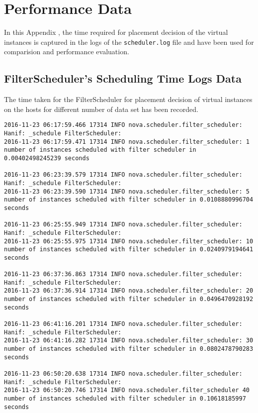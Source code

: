 
\chapter{Performance Data}\label{app:ch:data}

In this Appendix , the time required for placement decision of the virtual instances is captured in the logs of the \verb|scheduler.log| file and have been used for comparision and performance evaluation.

\section{FilterScheduler's Scheduling Time Logs Data}\label{app:sec:filterschedulerlogdata}

The time taken for the FilterScheduler for placement decision of virtual instances on the hosts for different number of data set has been recorded.
\newline
\begin{lstlisting}[frame=single, caption={The filter scheduler based scheduler time logs for scheduling different numbers of virtual instances}, label={lst:filterschedulerlogdata}]
2016-11-23 06:17:59.466 17314 INFO nova.scheduler.filter_scheduler: Hanif: _schedule FilterScheduler:
2016-11-23 06:17:59.471 17314 INFO nova.scheduler.filter_scheduler: 1 number of instances scheduled with filter scheduler in 0.00402498245239 seconds

2016-11-23 06:23:39.579 17314 INFO nova.scheduler.filter_scheduler: Hanif: _schedule FilterScheduler:
2016-11-23 06:23:39.590 17314 INFO nova.scheduler.filter_scheduler: 5 number of instances scheduled with filter scheduler in 0.0108880996704 seconds

2016-11-23 06:25:55.949 17314 INFO nova.scheduler.filter_scheduler: Hanif: _schedule FilterScheduler:
2016-11-23 06:25:55.975 17314 INFO nova.scheduler.filter_scheduler: 10 number of instances scheduled with filter scheduler in 0.0240979194641 seconds

2016-11-23 06:37:36.863 17314 INFO nova.scheduler.filter_scheduler: Hanif: _schedule FilterScheduler:
2016-11-23 06:37:36.914 17314 INFO nova.scheduler.filter_scheduler: 20 number of instances scheduled with filter scheduler in 0.0496470928192 seconds

2016-11-23 06:41:16.201 17314 INFO nova.scheduler.filter_scheduler: Hanif: _schedule FilterScheduler:
2016-11-23 06:41:16.282 17314 INFO nova.scheduler.filter_scheduler: 30 number of instances scheduled with filter scheduler in 0.0802478790283 seconds

2016-11-23 06:50:20.638 17314 INFO nova.scheduler.filter_scheduler: Hanif: _schedule FilterScheduler:
2016-11-23 06:50:20.746 17314 INFO nova.scheduler.filter_scheduler 40 number of instances scheduled with filter scheduler in 0.10618185997 seconds
\end{lstlisting}

